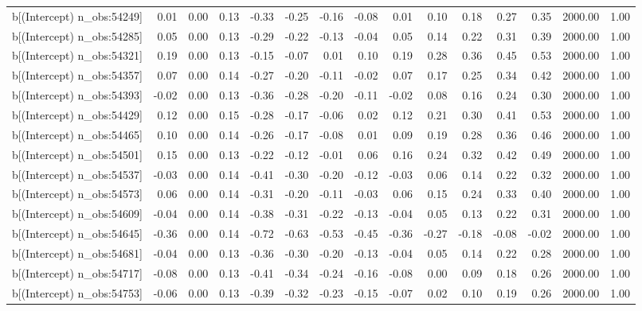 \begin{table}[ht]
\begin{tabular}{rrrrrrrrrrrrrrr}
  b[(Intercept) n\_obs:54249] & 0.01 & 0.00 & 0.13 & -0.33 & -0.25 & -0.16 & -0.08 & 0.01 & 0.10 & 0.18 & 0.27 & 0.35 & 2000.00 & 1.00 \\ 
  b[(Intercept) n\_obs:54285] & 0.05 & 0.00 & 0.13 & -0.29 & -0.22 & -0.13 & -0.04 & 0.05 & 0.14 & 0.22 & 0.31 & 0.39 & 2000.00 & 1.00 \\ 
  b[(Intercept) n\_obs:54321] & 0.19 & 0.00 & 0.13 & -0.15 & -0.07 & 0.01 & 0.10 & 0.19 & 0.28 & 0.36 & 0.45 & 0.53 & 2000.00 & 1.00 \\ 
  b[(Intercept) n\_obs:54357] & 0.07 & 0.00 & 0.14 & -0.27 & -0.20 & -0.11 & -0.02 & 0.07 & 0.17 & 0.25 & 0.34 & 0.42 & 2000.00 & 1.00 \\ 
  b[(Intercept) n\_obs:54393] & -0.02 & 0.00 & 0.13 & -0.36 & -0.28 & -0.20 & -0.11 & -0.02 & 0.08 & 0.16 & 0.24 & 0.30 & 2000.00 & 1.00 \\ 
  b[(Intercept) n\_obs:54429] & 0.12 & 0.00 & 0.15 & -0.28 & -0.17 & -0.06 & 0.02 & 0.12 & 0.21 & 0.30 & 0.41 & 0.53 & 2000.00 & 1.00 \\ 
  b[(Intercept) n\_obs:54465] & 0.10 & 0.00 & 0.14 & -0.26 & -0.17 & -0.08 & 0.01 & 0.09 & 0.19 & 0.28 & 0.36 & 0.46 & 2000.00 & 1.00 \\ 
  b[(Intercept) n\_obs:54501] & 0.15 & 0.00 & 0.13 & -0.22 & -0.12 & -0.01 & 0.06 & 0.16 & 0.24 & 0.32 & 0.42 & 0.49 & 2000.00 & 1.00 \\ 
  b[(Intercept) n\_obs:54537] & -0.03 & 0.00 & 0.14 & -0.41 & -0.30 & -0.20 & -0.12 & -0.03 & 0.06 & 0.14 & 0.22 & 0.32 & 2000.00 & 1.00 \\ 
  b[(Intercept) n\_obs:54573] & 0.06 & 0.00 & 0.14 & -0.31 & -0.20 & -0.11 & -0.03 & 0.06 & 0.15 & 0.24 & 0.33 & 0.40 & 2000.00 & 1.00 \\ 
  b[(Intercept) n\_obs:54609] & -0.04 & 0.00 & 0.14 & -0.38 & -0.31 & -0.22 & -0.13 & -0.04 & 0.05 & 0.13 & 0.22 & 0.31 & 2000.00 & 1.00 \\ 
  b[(Intercept) n\_obs:54645] & -0.36 & 0.00 & 0.14 & -0.72 & -0.63 & -0.53 & -0.45 & -0.36 & -0.27 & -0.18 & -0.08 & -0.02 & 2000.00 & 1.00 \\ 
  b[(Intercept) n\_obs:54681] & -0.04 & 0.00 & 0.13 & -0.36 & -0.30 & -0.20 & -0.13 & -0.04 & 0.05 & 0.14 & 0.22 & 0.28 & 2000.00 & 1.00 \\ 
  b[(Intercept) n\_obs:54717] & -0.08 & 0.00 & 0.13 & -0.41 & -0.34 & -0.24 & -0.16 & -0.08 & 0.00 & 0.09 & 0.18 & 0.26 & 2000.00 & 1.00 \\ 
  b[(Intercept) n\_obs:54753] & -0.06 & 0.00 & 0.13 & -0.39 & -0.32 & -0.23 & -0.15 & -0.07 & 0.02 & 0.10 & 0.19 & 0.26 & 2000.00 & 1.00 \\ 

\end{tabular}
\end{table}
